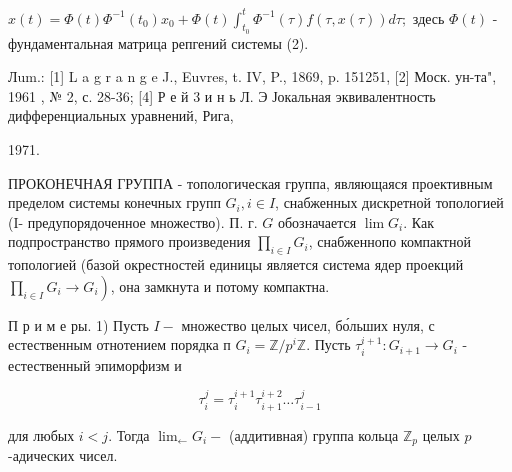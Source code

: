 \documentclass[10pt]{article}
\begin{document}
$x(t)=\Phi(t) \Phi^{-1}\left(t_{0}\right) x_{0}+\Phi(t) \int_{t_{0}}^{t} \Phi^{-1}(\tau) f(\tau, x(\tau)) d \tau ;$ здесь $\Phi(t)$ - фундаментальная матрица репгений системы (2).



Лum.: [1] L a g r a n g e J., Euvres, t. IV, P., 1869, p. 151251, [2] Моск. ун-та", 1961 , № 2, с. 28-36; [4] Р е й 3 и н ь Л. Э Јокальная эквивалентность дифференциальных уравнений, Рига,

1971.



ПРОКОНЕЧНАЯ ГРУППА - топологическая группа, являющаяся проективным пределом системы конечных групп $G_{i}, i \in I$, снабженных дискретной топологией (I- предупорядоченное множество). П. г. $G$ обозначается $\lim G_{i}$. Как подпространство прямого произведения $\prod_{i \in I} G_{i}$, снабженнопо компактной топологией (базой окрестностей единицы является система ядер проекций $\left.\prod_{i \in I} G_{i} \rightarrow G_{i}\right)$, она замкнута и потому компактна.



П р и м е ры. 1) Пусть $I-$ множество целых чисел, бо́льших нуля, с естественным отнотением порядка п $G_{i}=\mathbb{Z} / p^{i} \mathbb{Z}$. Пусть $\tau_{i}^{i+1}: G_{i+1} \rightarrow G_{i}$ - естественный эпиморфизм и



\[

\tau_{i}^{j}=\tau_{i}^{i+1} \tau_{i+1}^{i+2} \ldots \tau_{i-1}^{j}

\]



для любых $i<j$. Тогда $\lim _{\longleftarrow} G_{i}-$ (аддитивная) группа кольца $\mathbb{Z}_{p}$ целых $p$-адических чисел.
\end{document}
